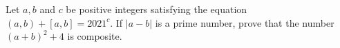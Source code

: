 Let $a, b$ and $c$ be positive integers satisfying the equation $(a, b) + [a, b]=2021^c$. If $|a-b|$ is a prime number, prove that the number $(a+b)^2+4$ is composite.